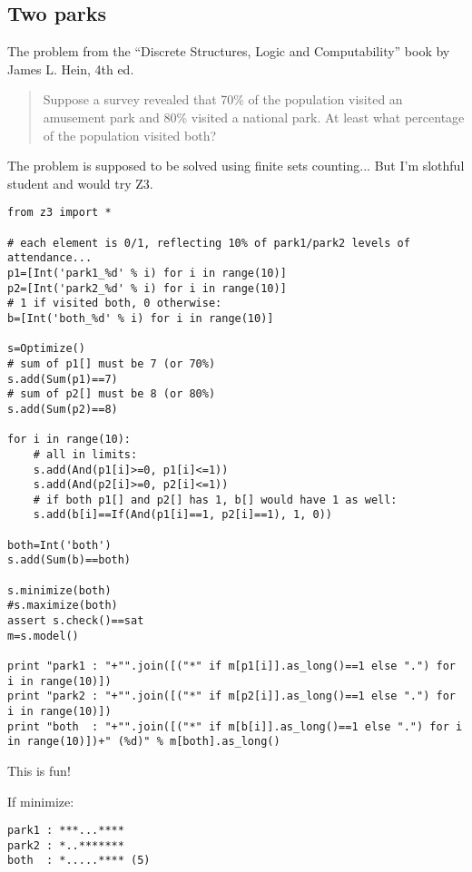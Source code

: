 \subsection{Two parks}

The problem from the ``Discrete Structures, Logic and Computability'' book by James L. Hein, 4th ed.

\begin{framed}
\begin{quotation}

Suppose a survey revealed that 70\% of the population visited
an amusement park and 80\% visited a national park.
At least what percentage of the population visited both?

\end{quotation}
\end{framed}

The problem is supposed to be solved using finite sets counting...
But I'm slothful student and would try Z3.

\begin{lstlisting}[style=custompy]
from z3 import *

# each element is 0/1, reflecting 10% of park1/park2 levels of attendance...
p1=[Int('park1_%d' % i) for i in range(10)]
p2=[Int('park2_%d' % i) for i in range(10)]
# 1 if visited both, 0 otherwise:
b=[Int('both_%d' % i) for i in range(10)]

s=Optimize()
# sum of p1[] must be 7 (or 70%)
s.add(Sum(p1)==7)
# sum of p2[] must be 8 (or 80%)
s.add(Sum(p2)==8)

for i in range(10):
    # all in limits:
    s.add(And(p1[i]>=0, p1[i]<=1))
    s.add(And(p2[i]>=0, p2[i]<=1))
    # if both p1[] and p2[] has 1, b[] would have 1 as well:
    s.add(b[i]==If(And(p1[i]==1, p2[i]==1), 1, 0))

both=Int('both')
s.add(Sum(b)==both)

s.minimize(both)
#s.maximize(both)
assert s.check()==sat
m=s.model()

print "park1 : "+"".join([("*" if m[p1[i]].as_long()==1 else ".") for i in range(10)])
print "park2 : "+"".join([("*" if m[p2[i]].as_long()==1 else ".") for i in range(10)])
print "both  : "+"".join([("*" if m[b[i]].as_long()==1 else ".") for i in range(10)])+" (%d)" % m[both].as_long()
\end{lstlisting}

This is fun!

If minimize:

\begin{lstlisting}
park1 : ***...****
park2 : *..*******
both  : *.....**** (5)
\end{lstlisting}

